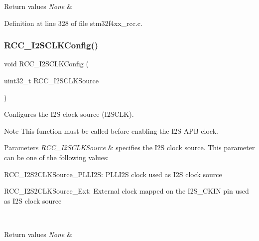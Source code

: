 \begin{DoxyRetVals}{Return values}
{\em None} & \\
\hline
\end{DoxyRetVals}


Definition at line 328 of file stm32f4xx\+\_\+rcc.\+c.

\mbox{\label{group___r_c_c_ga6c56f8529988fcc8f4dbffbc1bab27d0}} 
\subsubsection{\texorpdfstring{R\+C\+C\+\_\+\+I2\+S\+C\+L\+K\+Config()}{RCC\_I2SCLKConfig()}}
{\footnotesize\ttfamily void R\+C\+C\+\_\+\+I2\+S\+C\+L\+K\+Config (\begin{DoxyParamCaption}\item[{uint32\+\_\+t}]{R\+C\+C\+\_\+\+I2\+S\+C\+L\+K\+Source }\end{DoxyParamCaption})}



Configures the I2S clock source (I2\+S\+C\+LK). 

\begin{DoxyNote}{Note}
This function must be called before enabling the I2S A\+PB clock. 
\end{DoxyNote}

\begin{DoxyParams}{Parameters}
{\em R\+C\+C\+\_\+\+I2\+S\+C\+L\+K\+Source} & specifies the I2S clock source. This parameter can be one of the following values\+: \begin{DoxyItemize}
\item R\+C\+C\+\_\+\+I2\+S2\+C\+L\+K\+Source\+\_\+\+P\+L\+L\+I2S\+: P\+L\+L\+I2S clock used as I2S clock source \item R\+C\+C\+\_\+\+I2\+S2\+C\+L\+K\+Source\+\_\+\+Ext\+: External clock mapped on the I2\+S\+\_\+\+C\+K\+IN pin used as I2S clock source \end{DoxyItemize}
\\
\hline
\end{DoxyParams}

\begin{DoxyRetVals}{Return values}
{\em None} & \\
\hline
\end{DoxyRetVals}


